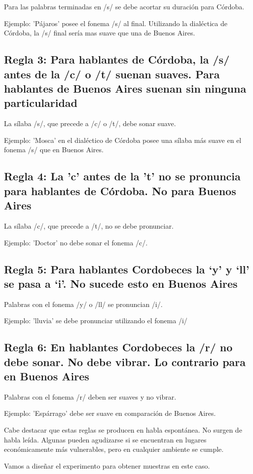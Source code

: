 Para las palabras terminadas en /s/ se debe acortar su duración para Córdoba. 

Ejemplo: 'Pájaros' posee el fonema /s/ al final. Utilizando la dialéctica de Córdoba, la /s/ final sería mas suave que una de Buenos Aires. 

\subsection*{Regla 3: Para hablantes de Córdoba, la /s/ antes de la /c/ o /t/ suenan suaves. Para hablantes de Buenos Aires suenan sin ninguna particularidad}

La sílaba /s/, que precede a /c/ o /t/, debe sonar suave. 

Ejemplo: 'Mosca' en el dialéctico de Córdoba posee una sílaba más suave en el fonema /s/ que en Buenos Aires. 

\subsection*{Regla 4: La 'c' antes de la 't' no se pronuncia para hablantes de Córdoba. No para Buenos Aires}

La sílaba /c/, que precede a /t/, no se debe pronunciar. 

Ejemplo: 'Doctor' no debe sonar el fonema /c/.

\subsection*{Regla 5: Para hablantes Cordobeces la ‘y’ y ‘ll’ se pasa a ‘i’. No sucede esto en Buenos Aires}

Palabras con el fonema /y/ o /ll/ se pronuncian /i/. 

Ejemplo: 'lluvia' se debe pronunciar utilizando el fonema /i/ 

\subsection*{Regla 6: En hablantes Cordobeces la /r/ no debe sonar. No debe vibrar. Lo contrario para en Buenos Aires}

Palabras con el fonema /r/ deben ser suaves y no vibrar. 

Ejemplo: 'Espárrago' debe ser suave en comparación de Buenos Aires. 

Cabe destacar que estas reglas se producen en habla espontánea. No surgen de habla leída. Algunas pueden agudizarse si se encuentran en lugares económicamente más vulnerables, pero en cualquier ambiente se cumple.

Vamos a diseñar el experimento para obtener muestras en este caso.
